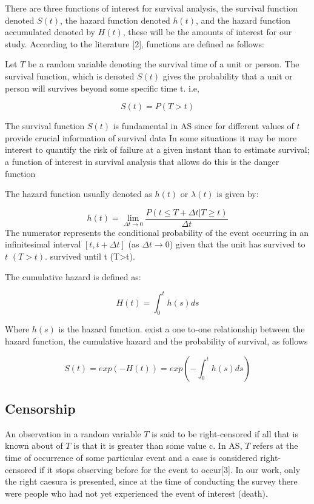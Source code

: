 \documentclass[
  twocolumn]{article}
\begin{document}
There are three functions of interest for survival analysis, the
survival function denoted \(S(t)\), the hazard function denoted
\(h(t)\), and the hazard function accumulated denoted by \(H(t)\), these
will be the amounts of interest for our study. According to the
literature {[}2{]}, functions are defined as follows:

Let \(T\) be a random variable denoting the survival time of a unit or
person. The survival function, which is denoted \(S(t)\) gives the
probability that a unit or person will survives beyond some specific
time t. i.e,

\[S(t)= P(T>t)\]

The survival function \(S(t)\) is fundamental in AS since for different
values of \(t\) provide crucial information of survival data In some
situations it may be more interest to quantify the risk of failure at a
given instant than to estimate survival; a function of interest in
survival analysis that allows do this is the danger function

The hazard function usually denoted as \(h(t)\) or \(\lambda(t)\) is
given by:

\[ h(t)=\lim_{\Delta t \to 0}\frac{P(t\leq T+\Delta t|T\geq t)}{\Delta t}\]
The numerator represents the conditional probability of the event
occurring in an infinitesimal interval \([t,t+\Delta t]\) (as
\(\Delta t\to 0\)) given that the unit has survived to \(t\) \((T>t)\).
survived until t (T\textgreater t).

The cumulative hazard is defined as:

\[H(t)=\int_{0}^{t}h(s)ds\]

Where \(h(s)\) is the hazard function. exist a one to-one relationship
between the hazard function, the cumulative hazard and the probability
of survival, as follows

\[S(t)=exp(-H(t))=exp(-\int_{0}^{t}h(s)ds)\]

\hypertarget{censorship}{%
\subsection{Censorship}\label{censorship}}

An observation in a random variable \(T\) is said to be right-censored
if all that is known about of \(T\) is that it is greater than some
value c. In AS, \(T\) refers at the time of occurrence of some
particular event and a case is considered right-censored if it stops
observing before for the event to occur{[}3{]}. In our work, only the
right caesura is presented, since at the time of conducting the survey
there were people who had not yet experienced the event of interest
(death).
\end{document}
